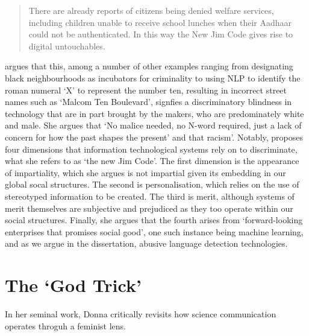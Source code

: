 \begin{quote}{\cite[p. 133]{Benjamin:2019}}
  There are already reports of citizens being denied welfare services, including children unable to receive school lunches when their Aadhaar could not be authenticated. In this way the New Jim Code gives rise to digital untouchables.
\end{quote}

\cite{Benjamin:2019} argues that this, among a number of other examples ranging from designating black neighbourhoods as incubators for criminality to using NLP to identify the roman numeral `X' to represent the number ten, resulting in incorrect street names such as `Malcom Ten Boulevard', signfies a discriminatory blindness in technology that are in part brought by the makers, who are predominately white and male. She argues that `No malice needed, no N-word required, just a lack of concern for how the past shapes the present' and that racism'. Notably, \cite{Benjamin:2019} proposes four dimensions that information technological systems rely on to discriminate, what she refers to as `the new Jim Code'. The first dimension is the appearance of impartiality, which she argues is not impartial given its embedding in our global socal structures. The second is personalisation, which relies on the use of stereotyped information to be created. The third is merit, although systems of merit themselves are subjective and prejudiced as they too operate within our social structures. Finally, she argues that the fourth arises from `forward-looking enterprises that promises social good', one such instance being machine learning, and as we argue in the dissertation, abusive language detection technologies.

\section{The `God Trick'}

In her seminal work, Donna \cite{Haraway:1988} critically revisits how science communication operates throguh a feminist lens.






